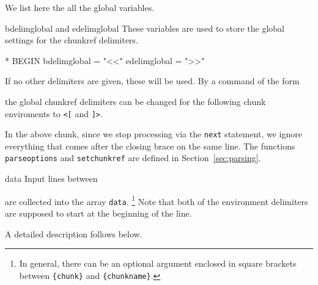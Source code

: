\documentclass[a4paper]{article} %
\newenvironment{ttdescription}
  {\list{}{\labelwidth0pt \itemindent-\leftmargin
      \def\makelabel##1{\hspace\labelsep
        \normalfont\ttfamily ##1:}}}
  {\endlist}
\begin{document}
We list here the all the global variables.
\begin{ttdescription}
\item[bdelimglobal \textrm{and} edelimglobal] These variables are used
  to store the global settings for the chunkref delimiters.
\begin{chunk}{*}
BEGIN {
  bdelimglobal = "<<"
  edelimglobal = ">>"
}
\end{chunk}
If no other delimiters are given, these will be used. 
By a command of the form
\begin{myverbatim}
\end{myverbatim}
the global chunkref delimiters can be changed for the following chunk
enviroments to \texttt{<[} and \texttt{]>}.
\begin{chunk}{*}
/^\\lstset{/ {
  lineidx = 8 # start parsing after "\lstset{"
  if (parseoptions() != "}") {error("Expected closing brace")}#$
  if (setchunkref()) {bdelimglobal = bdelim; edelimglobal = edelim}
  next
}
\end{chunk}
In the above chunk, since we stop processing via the \texttt{next}
statement, we ignore everything that comes after the closing brace on
the same line. The functions \texttt{parseoptions} and
\texttt{setchunkref} are defined in Section~\ref{sec:parsing}.

\item[data] Input lines between
\begin{myverbatim}
\end{myverbatim}
are collected into the array \texttt{data}.%
\footnote{In general, there can be an optional argument enclosed in
  square brackets between \texttt{\{chunk\}} and
  \texttt{\{chunkname\}}.}
%
Note that both of the environment delimiters are supposed to start at
the beginning of the line.

A detailed description follows below.


\end{ttdescription}
\end{document}
